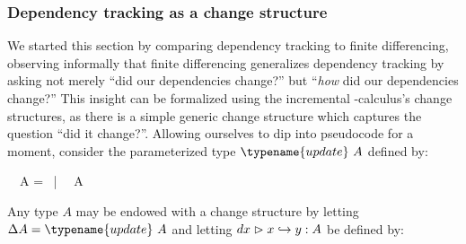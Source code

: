   



\subsubsection{Dependency tracking as a change structure}

We started this section by comparing dependency tracking to finite differencing,
observing informally that finite differencing generalizes dependency tracking by
asking not merely ``did our dependencies change?'' but ``\emph{how} did our
dependencies change?'' This insight can be formalized using the incremental
\fn-calculus's change structures, as there is a simple generic change structure
which captures the question ``did it change?''. Allowing ourselves to dip into
pseudocode for a moment, consider the parameterized type $\typename{update}~A$
defined by:

\nopagebreak[2]
\begin{code}
  ~~A
  =  ~|~ ~A
\end{code}

\noindent
Any type $A$ may be endowed with a change structure by letting $\Delta A = \typename{update}~A$ and letting $\gvalid{A}{dx} x y$ be defined by:
%
\begin{mathpar}

\end{mathpar}

